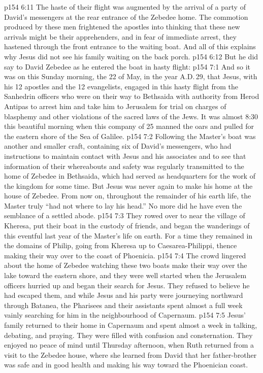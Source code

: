 \vs p154 6:11 The haste of their flight was augmented by the arrival of a party of David’s messengers at the rear entrance of the Zebedee home. The commotion produced by these men frightened the apostles into thinking that these new arrivals might be their apprehenders, and in fear of immediate arrest, they hastened through the front entrance to the waiting boat. And all of this explains why Jesus did not see his family waiting on the back porch.
\vs p154 6:12 But he did say to David Zebedee as he entered the boat in hasty flight: 
\vs p154 7:1 And so it was on this Sunday morning, the 22 of May, in the year A.D.\,29, that Jesus, with his 12 apostles and the 12 evangelists, engaged in this hasty flight from the Sanhedrin officers who were on their way to Bethsaida with authority from Herod Antipas to arrest him and take him to Jerusalem for trial on charges of blasphemy and other violations of the sacred laws of the Jews. It was almost 8:30 this beautiful morning when this company of 25 manned the oars and pulled for the eastern shore of the Sea of Galilee.
\vs p154 7:2 Following the Master’s boat was another and smaller craft, containing six of David’s messengers, who had instructions to maintain contact with Jesus and his associates and to see that information of their whereabouts and safety was regularly transmitted to the home of Zebedee in Bethsaida, which had served as headquarters for the work of the kingdom for some time. But Jesus was never again to make his home at the house of Zebedee. From now on, throughout the remainder of his earth life, the Master truly “had not where to lay his head.” No more did he have even the semblance of a settled abode.
\vs p154 7:3 They rowed over to near the village of Kheresa, put their boat in the custody of friends, and began the wanderings of this eventful last year of the Master’s life on earth. For a time they remained in the domains of Philip, going from Kheresa up to Caesarea\hyp{}Philippi, thence making their way over to the coast of Phoenicia.
\vs p154 7:4 \pc The crowd lingered about the home of Zebedee watching these two boats make their way over the lake toward the eastern shore, and they were well started when the Jerusalem officers hurried up and began their search for Jesus. They refused to believe he had escaped them, and while Jesus and his party were journeying northward through Batanea, the Pharisees and their assistants spent almost a full week vainly searching for him in the neighbourhood of Capernaum.
\vs p154 7:5 Jesus’ family returned to their home in Capernaum and spent almost a week in talking, debating, and praying. They were filled with confusion and consternation. They enjoyed no peace of mind until Thursday afternoon, when Ruth returned from a visit to the Zebedee house, where she learned from David that her father\hyp{}brother was safe and in good health and making his way toward the Phoenician coast.
\quizlink
